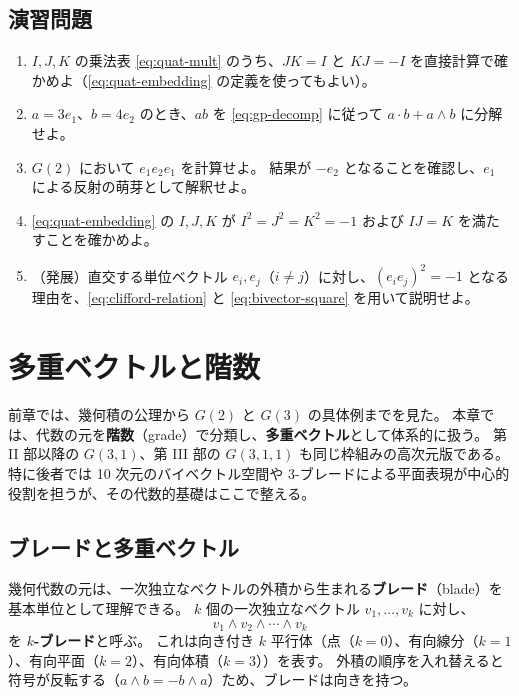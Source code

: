 \documentclass[dvipdfmx,a4paper,oneside]{jsbook}
\numberwithin{equation}{chapter}
\begin{document}
\section*{演習問題}

\begin{enumerate}[leftmargin=2em]
  \item \(I,J,K\) の乗法表 \eqref{eq:quat-mult} のうち、\(JK = I\) と \(KJ = -I\) を直接計算で確かめよ（\eqref{eq:quat-embedding} の定義を使ってもよい）。

  \item \(a = 3e_1\)、\(b = 4e_2\) のとき、\(ab\) を \eqref{eq:gp-decomp} に従って \(a\cdot b + a\wedge b\) に分解せよ。

  \item \(G(2)\) において \(e_1 e_2 e_1\) を計算せよ。
  結果が \(-e_2\) となることを確認し、\(e_1\) による反射の萌芽として解釈せよ。

  \item \eqref{eq:quat-embedding} の \(I,J,K\) が \(I^2 = J^2 = K^2 = -1\) および \(IJ = K\) を満たすことを確かめよ。

  \item （発展）直交する単位ベクトル \(e_i, e_j\)（\(i \neq j\)）に対し、\((e_i e_j)^2 = -1\) となる理由を、\eqref{eq:clifford-relation} と \eqref{eq:bivector-square} を用いて説明せよ。
\end{enumerate}

\chapter{多重ベクトルと階数}

前章では、幾何積の公理から \(G(2)\) と \(G(3)\) の具体例までを見た。
本章では、代数の元を\textbf{階数}（grade）で分類し、\textbf{多重ベクトル}として体系的に扱う。
第 II 部以降の \(G(3,1)\)、第 III 部の \(G(3,1,1)\) も同じ枠組みの高次元版である。
特に後者では 10 次元のバイベクトル空間や 3-ブレードによる平面表現が中心的役割を担うが、その代数的基礎はここで整える。

\section{ブレードと多重ベクトル}

幾何代数の元は、一次独立なベクトルの外積から生まれる\textbf{ブレード}（blade）を基本単位として理解できる。
\(k\) 個の一次独立なベクトル \(v_1,\ldots,v_k\) に対し、
\begin{equation}
  v_1 \wedge v_2 \wedge \cdots \wedge v_k
  \label{eq:k-blade}
\end{equation}
を \textbf{\(k\)-ブレード}と呼ぶ。
これは向き付き \(k\) 平行体（点（\(k=0\)）、有向線分（\(k=1\)）、有向平面（\(k=2\)）、有向体積（\(k=3\)））を表す。
外積の順序を入れ替えると符号が反転する（\(a\wedge b = -b\wedge a\)）ため、ブレードは向きを持つ。
\end{document}
